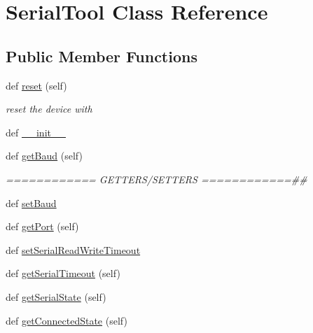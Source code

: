 \hypertarget{classstm__tools_1_1serialflasher_1_1serialtool_1_1SerialTool}{}\section{Serial\+Tool Class Reference}
\label{classstm__tools_1_1serialflasher_1_1serialtool_1_1SerialTool}
\subsection*{Public Member Functions}
\begin{DoxyCompactItemize}
\item 
def \hyperlink{classstm__tools_1_1serialflasher_1_1serialtool_1_1SerialTool_a51829b63adb24ac48d350dee60181002}{reset} (self)
\begin{DoxyCompactList}\small\item\em reset the device with \end{DoxyCompactList}\item 
def \hyperlink{classstm__tools_1_1serialflasher_1_1serialtool_1_1SerialTool_ac775ee34451fdfa742b318538164070e}{\+\_\+\+\_\+init\+\_\+\+\_\+}
\item 
def \hyperlink{classstm__tools_1_1serialflasher_1_1serialtool_1_1SerialTool_a114788c4016c718a2039d4538bf0a84e}{get\+Baud} (self)
\begin{DoxyCompactList}\small\item\em ============ G\+E\+T\+T\+E\+R\+S/\+S\+E\+T\+T\+E\+RS ============\#\# \end{DoxyCompactList}\item 
def \hyperlink{classstm__tools_1_1serialflasher_1_1serialtool_1_1SerialTool_aa9bca33407cd58087eea6b276aff65c6}{set\+Baud}
\item 
def \hyperlink{classstm__tools_1_1serialflasher_1_1serialtool_1_1SerialTool_af7d10832669f64b540a251c3f2b5c0e5}{get\+Port} (self)
\item 
def \hyperlink{classstm__tools_1_1serialflasher_1_1serialtool_1_1SerialTool_a6290a27c45325e9f0bb11a9f677e6e73}{set\+Serial\+Read\+Write\+Timeout}
\item 
def \hyperlink{classstm__tools_1_1serialflasher_1_1serialtool_1_1SerialTool_a3a9f47662cbdfa0fc6ec4e2b3f6eb54e}{get\+Serial\+Timeout} (self)
\item 
def \hyperlink{classstm__tools_1_1serialflasher_1_1serialtool_1_1SerialTool_a502946040dfcc9c9a9e15a5e24be5cd1}{get\+Serial\+State} (self)
\item 
def \hyperlink{classstm__tools_1_1serialflasher_1_1serialtool_1_1SerialTool_ac6b967e091d488648e1cacacbe125050}{get\+Connected\+State} (self)

\end{DoxyCompactItemize}
